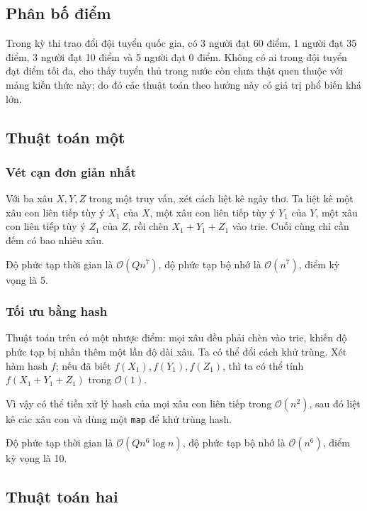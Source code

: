 \documentclass[11pt]{article}
\newcommand{\Oh}{\mathcal{O}}
\begin{document}
\subsection{Phân bố điểm}

Trong kỳ thi trao đổi đội tuyển quốc gia, có 3 người đạt 60 điểm, 1 người đạt
35 điểm, 3 người đạt 10 điểm và 5 người đạt 0 điểm. Không có ai trong đội
tuyển đạt điểm tối đa, cho thấy tuyển thủ trong nước còn chưa thật quen thuộc
với mảng kiến thức này; do đó các thuật toán theo hướng này có giá trị phổ
biến khá lớn.

\subsection{Thuật toán một}

\subsubsection{Vét cạn đơn giản nhất}

Với ba xâu \(X,Y,Z\) trong một truy vấn, xét cách liệt kê ngây thơ. Ta liệt kê
một xâu con liên tiếp tùy ý \(X_1\) của \(X\), một xâu con liên tiếp tùy ý
\(Y_1\) của \(Y\), một xâu con liên tiếp tùy ý \(Z_1\) của \(Z\), rồi chèn
\(X_1+Y_1+Z_1\) vào trie. Cuối cùng chỉ cần đếm có bao nhiêu xâu.

Độ phức tạp thời gian là \(\Oh(Qn^7)\), độ phức tạp bộ nhớ là \(\Oh(n^7)\),
điểm kỳ vọng là 5.

\subsubsection{Tối ưu bằng hash}

Thuật toán trên có một nhược điểm: mọi xâu đều phải chèn vào trie, khiến độ
phức tạp bị nhân thêm một lần độ dài xâu. Ta có thể đổi cách khử trùng. Xét
hàm hash \(f\); nếu đã biết \(f(X_1),f(Y_1),f(Z_1)\), thì ta có thể tính
\(f(X_1+Y_1+Z_1)\) trong \(\Oh(1)\).

Vì vậy có thể tiền xử lý hash của mọi xâu con liên tiếp trong \(\Oh(n^2)\),
sau đó liệt kê các xâu con và dùng một \texttt{map} để khử trùng hash.

Độ phức tạp thời gian là \(\Oh(Qn^6\log n)\), độ phức tạp bộ nhớ là
\(\Oh(n^6)\), điểm kỳ vọng là 10.

\subsection{Thuật toán hai}
\end{document}
